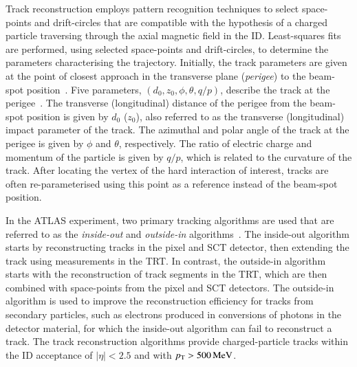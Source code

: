 Track reconstruction employs pattern recognition techniques to select
space-points and drift-circles that are compatible with the hypothesis of a
charged particle traversing through the axial magnetic field in the
ID. Least-squares fits are performed, using selected space-points and
drift-circles, to determine the parameters characterising the
trajectory. Initially, the track parameters are given at the point of closest
approach in the transverse plane (\emph{perigee}) to the beam-spot
position~\cite{PERF-2015-08}. Five parameters, $(d_0, z_0, \phi, \theta, q/p)$,
describe the track at the perigee~\cite{Akesson:2006sh}. The transverse
(longitudinal) distance of the perigee from the beam-spot position is given by
$d_0$ ($z_0$), also referred to as the transverse (longitudinal) impact
parameter of the track. The azimuthal and polar angle of the track at the
perigee is given by $\phi$ and $\theta$, respectively. The ratio of electric
charge and momentum of the particle is given by $q / p$, which is related to the
curvature of the track. After locating the vertex of the hard interaction of
interest, tracks are often re-parameterised using this point as a reference
instead of the beam-spot position.

In the ATLAS experiment, two primary tracking algorithms are used that are
referred to as the \emph{inside-out} and \emph{outside-in}
algorithms~\cite{Cornelissen:2007vba,Salzburger:2015sgq,PERF-2015-08}. The
inside-out algorithm starts by reconstructing tracks in the pixel and SCT
detector, then extending the track using measurements in the TRT. In contrast,
the outside-in algorithm starts with the reconstruction of track segments in the
TRT, which are then combined with space-points from the pixel and SCT
detectors. The outside-in algorithm is used to improve the reconstruction
efficiency for tracks from secondary particles, such as electrons produced in
conversions of photons in the detector material, for which the inside-out
algorithm can fail to reconstruct a track. The track reconstruction algorithms
provide charged-particle tracks within the ID acceptance of $|\eta| < 2.5$ and
with $p_{\text{T}} > \SI{500}{\ensuremath{\text{MeV}}}$.

